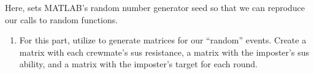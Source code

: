 \documentclass{article}
\begin{document}
Here,  sets MATLAB's random number generator seed so that we can
reproduce our calls to random functions.

\begin{enumerate}[leftmargin=*]
	\item
		For this part, utilize  to generate
		matrices for our \enquote{random} events. Create a
		 matrix with each crewmate's sus
		resistance, a  matrix with the imposter's
		sus ability, and  a  matrix with the
		imposter's target for each round.


\end{enumerate}
\end{document}
